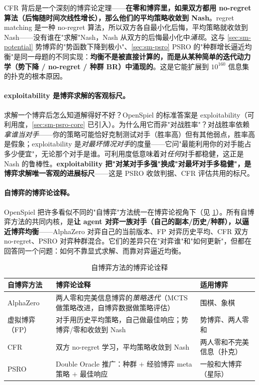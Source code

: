 \begin{insight}
CFR 背后是一个深刻的博弈论定理——\textbf{在零和博弈里，如果双方都用 no-regret 算法（后悔随时间次线性增长），那么他们的平均策略收敛到 Nash}。regret matching 是一种 no-regret 算法，所以双方各自最小化后悔，平均策略就收敛到 Nash——没有谁在"求解"Nash，Nash 从双方的后悔最小化中\emph{涌现}。这与 \cref{sec:sm-potential} 势博弈的"势函数下降到极小"、\cref{sec:sm-psro} PSRO 的"种群增长逼近均衡"是同一母题的不同实现：\textbf{均衡不是被直接计算的，而是从某种简单的迭代动力学（势下降 / no-regret / 种群 BR）中涌现的}。这是它能扩展到 $10^{160}$ 信息集的扑克的根本原因。
\end{insight}

\paragraph{exploitability 是博弈求解的客观标尺。}
求解一个博弈后怎么知道解得好不好？OpenSpiel 的标准答案是 exploitability（可利用度，\cref{sec:sm-psro-core} 已引入）。为什么用它而非"对战胜率"？对战胜率依赖\emph{拿谁当对手}——你的策略可能恰好克制测试对手（胜率高）但有其他弱点，胜率高是假象；exploitability 是\emph{对最坏情况对手}的度量——它问"最能利用你的对手能占多少便宜"，无论那个对手是谁。可利用度低意味着对\emph{任何}对手都稳健，这正是 Nash 的鲁棒性。\textbf{exploitability 把"对某对手多强"换成"对最坏对手多稳健"，是博弈求解唯一客观的进展标尺}——这是 PSRO 收敛判据、CFR 评估共用的标尺。

\paragraph{自博弈的博弈论诠释。}
OpenSpiel 把许多看似不同的"自博弈"方法统一在博弈论视角下（见 \cref{tab:sm-selfplay}）。所有自博弈方法的共同内核，是\textbf{让 agent 对弈一族对手（自己的副本/历史/种群），以逼近博弈均衡}——AlphaZero 对弈自己的当前版本、FP 对弈历史平均、CFR 双方 no-regret、PSRO 对弈种群混合。它们的差异只在"对弈谁"和"如何更新"，但都在回答同一个问题：如何不靠显式求解、而靠对弈逼近均衡。

\begin{table}[H]\centering\small
\caption{自博弈方法的博弈论诠释}
\label{tab:sm-selfplay}
\begin{tabular}{p{} p{} p{}}
\toprule
自博弈方法 & 博弈论诠释 & 适用博弈 \\
\midrule
AlphaZero & 两人零和完美信息博弈的\emph{策略迭代}（MCTS 做策略改进，自博弈数据做策略评估） & 围棋、象棋 \\
虚拟博弈（FP） & 对手用历史平均策略，自己做最佳响应；势博弈/零和收敛到 Nash & 势博弈、两人零和 \\
CFR & 双方 no-regret 学习，平均策略收敛到 Nash & 两人零和不完美信息（扑克） \\
PSRO & Double Oracle 推广：种群 $+$ 经验博弈 meta 策略 $+$ 最佳响应 & 一般和大博弈（星际） \\
\bottomrule
\end{tabular}
\end{table}

